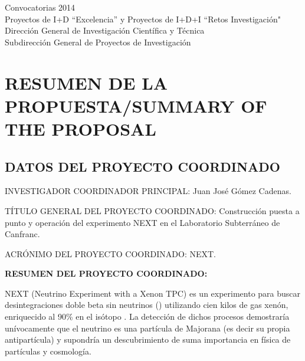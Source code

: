 \documentclass[a4paper,11pt,oneside]{article}
\begin{document}


\begin{center}
{\Large \textsf{Convocatorias 2014}} \\ \vspace{0.3cm}
{\Large  \textsf{Proyectos de I+D ``Excelencia'' y Proyectos de I+D+I ``Retos Investigación"}} \\ 
{\Large \textsf{Dirección General de Investigación Científica y Técnica}} \\
{\Large \textsf{Subdirección General de Proyectos de Investigación }} \\ 
\end{center}


\section{\bf \textsf{RESUMEN DE LA PROPUESTA/SUMMARY OF THE PROPOSAL}}
\subsection{\sc DATOS DEL PROYECTO COORDINADO}

{\sc INVESTIGADOR COORDINADOR PRINCIPAL:} Juan José Gómez Cadenas.
\vspace{0.3cm}

{\sc TÍTULO GENERAL DEL PROYECTO COORDINADO:} Construcción puesta a punto y operación del experimento NEXT en el Laboratorio Subterráneo de Canfranc.
\vspace{0.3cm}

{\sc ACRÓNIMO DEL PROYECTO COORDINADO:} NEXT.
\vspace{0.3cm}

{\bf RESUMEN DEL PROYECTO COORDINADO:} 
\vspace{0.3cm}

NEXT (Neutrino Experiment with a Xenon TPC) es un experimento para buscar desintegraciones doble beta sin neutrinos (\bbonu) utilizando cien kilos de gas xenón, enriquecido al 90\% en el isótopo \XE. La detección de dichos procesos demostraría unívocamente que el neutrino es una partícula de Majorana (es decir su propia antipartícula) y supondría un descubrimiento de suma importancia en física de partículas y cosmología. 
\end{document}
